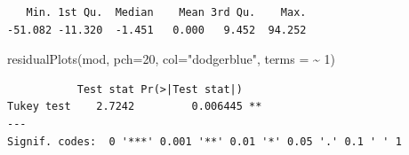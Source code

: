 \documentclass[
  letterpaper,
  DIV=11,
  numbers=noendperiod]{scrartcl}
\newenvironment{Shaded}{\begin{snugshade}}{\end{snugshade}}
\newcommand{\AttributeTok}[1]{\textcolor[rgb]{0.40,0.45,0.13}{#1}}
\newcommand{\DecValTok}[1]{\textcolor[rgb]{0.68,0.00,0.00}{#1}}
\newcommand{\FunctionTok}[1]{\textcolor[rgb]{0.28,0.35,0.67}{#1}}
\newcommand{\NormalTok}[1]{\textcolor[rgb]{0.00,0.23,0.31}{#1}}
\newcommand{\SpecialCharTok}[1]{\textcolor[rgb]{0.37,0.37,0.37}{#1}}
\newcommand{\StringTok}[1]{\textcolor[rgb]{0.13,0.47,0.30}{#1}}
\begin{document}
\begin{verbatim}
   Min. 1st Qu.  Median    Mean 3rd Qu.    Max. 
-51.082 -11.320  -1.451   0.000   9.452  94.252 
\end{verbatim}

\begin{Shaded}
\begin{Highlighting}[]
\FunctionTok{residualPlots}\NormalTok{(mod, }\AttributeTok{pch=}\DecValTok{20}\NormalTok{, }\AttributeTok{col=}\StringTok{"dodgerblue"}\NormalTok{, }\AttributeTok{terms =} \SpecialCharTok{\textasciitilde{}} \DecValTok{1}\NormalTok{)}
\end{Highlighting}
\end{Shaded}


\begin{verbatim}
           Test stat Pr(>|Test stat|)   
Tukey test    2.7242         0.006445 **
---
Signif. codes:  0 '***' 0.001 '**' 0.01 '*' 0.05 '.' 0.1 ' ' 1
\end{verbatim}
\end{document}
